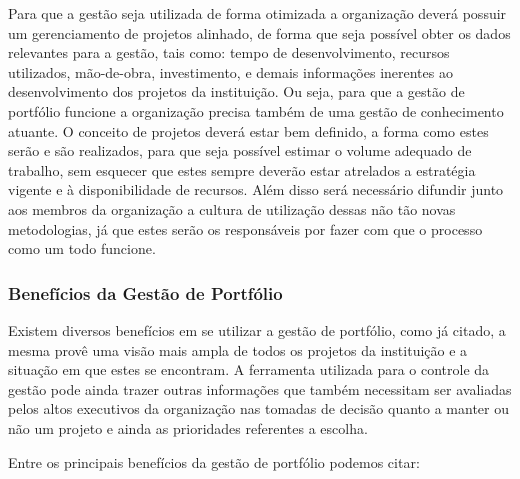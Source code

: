 \documentclass[a4paper,10pt]{article}
\begin{document}
\flushleft
Para que a gestão seja utilizada de forma otimizada a organização deverá possuir um gerenciamento de projetos alinhado, de forma que seja possível obter os dados relevantes para a gestão, 
tais como: tempo de desenvolvimento, recursos utilizados, mão-de-obra, investimento, e demais informações inerentes ao desenvolvimento dos projetos da instituição. Ou seja, para que a gestão de portfólio funcione a organização precisa também de uma gestão de conhecimento atuante.
O conceito de projetos deverá estar bem definido, a forma como estes serão e são realizados, para que seja possível estimar o volume adequado de trabalho, sem esquecer que estes sempre deverão estar
atrelados a estratégia vigente e à disponibilidade de recursos. Além disso será necessário difundir junto aos membros da organização a cultura de utilização dessas não tão novas metodologias, já que 
estes serão os responsáveis por fazer com que o processo como um todo funcione.

\subsubsection{Benefícios da Gestão de Portfólio}
\flushleft
Existem diversos benefícios em se utilizar a gestão de portfólio, como já citado, a mesma provê uma visão mais ampla de todos os projetos da instituição e a situação em que estes se encontram.
A ferramenta utilizada para o controle da gestão pode ainda trazer outras informações que também necessitam ser avaliadas pelos altos executivos da organização nas tomadas de decisão quanto a manter
ou não um projeto e ainda as prioridades referentes a escolha.

\flushleft 
Entre os principais benefícios da gestão de portfólio podemos citar:\cite{atila}
\end{document}
